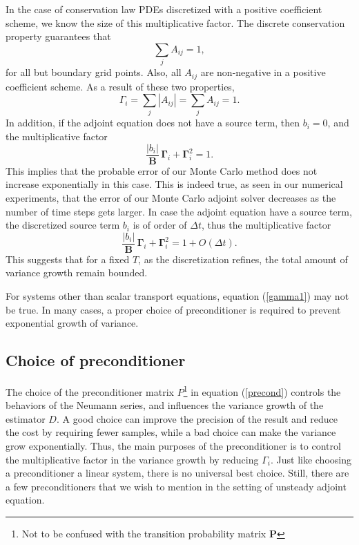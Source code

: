 \documentclass[a4paper,11pt]{article}
\theoremstyle{remark}
\theoremstyle{definition}
\begin{document}
        In the case of conservation law PDEs discretized with a positive
        coefficient scheme, we know the size of this multiplicative factor.
        The discrete conservation property guarantees that
        \[ \sum_j A_{ij} = 1,
        \]
        for all but boundary grid points.  Also, all $A_{ij}$ are non-negative
        in a positive coefficient scheme.  As a result of these two properties,
        \begin{equation} \label{gamma1}
            \Gamma_i = \sum_j |A_{ij}| = \sum_j A_{ij} = 1.
        \end{equation}
        In addition, if the adjoint equation does not have a source term,
        then $b_i = 0$, and the multiplicative factor
        \[ \frac{|b_i|} {\mathbf{B}}\, \mathbf{\Gamma}_i
            + \mathbf{\Gamma}_i^2 = 1.
        \]
        This implies that the probable error of our Monte Carlo method does
        not increase exponentially in this case.  This is indeed true, as
        seen in our numerical experiments, that the error of our Monte Carlo
        adjoint solver decreases as the number of time steps gets larger.
        In case the adjoint equation have a source term, the discretized
        source term $b_i$ is of order of $\Delta t$, thus the multiplicative
        factor
        \[ \frac{|b_i|} {\mathbf{B}}\, \mathbf{\Gamma}_i
            + \mathbf{\Gamma}_i^2 = 1 + O(\Delta t).
        \]
        This suggests that for a fixed $T$, as the discretization refines,
        the total amount of variance growth remain bounded.

        For systems other than scalar transport equations, equation 
        (\ref{gamma1}) may not be true. In many cases, a proper choice of
        preconditioner is required to prevent exponential growth of variance.



    \subsection{Choice of preconditioner}
        The choice of the preconditioner matrix $P$\footnote{Not to be
        confused with the transition probability matrix $\mathbf{P}$} in
        equation (\ref{precond}) controls the behaviors of the Neumann
        series, and influences the variance growth of the estimator $D$. A
        good choice can improve the precision of the result and reduce the
        cost by requiring fewer samples, while a bad choice can make the
        variance grow exponentially.  Thus, the main purposes of the
        preconditioner is to control the multiplicative factor in the variance
        growth by reducing $\Gamma_i$.  Just like choosing a preconditioner
        a linear system, there is no universal best choice. Still, there are
        a few preconditioners that we wish to mention in the setting of
        unsteady adjoint equation.
        
\end{document}
